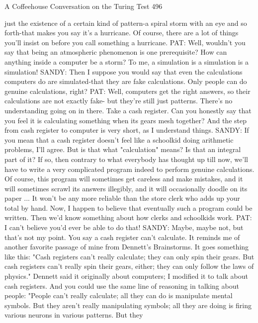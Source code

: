 A Coffeehouse Conversation on the Turing Test                                       496

   just the existence of a certain kind of pattern-a spiral storm with an eye and so
   forth-that makes you say it's a hurricane. Of course, there are a lot of things you'll
   insist on before you call something a hurricane.
PAT: Well, wouldn't you say that being an atmospheric phenomenon is one
   prerequisite? How can anything inside a computer be a storm? To me, a
   simulation is a simulation is a simulation!
SANDY: Then I suppose you would say that even the calculations computers do are
   simulated-that they are fake calculations. Only people can do genuine
   calculations, right?
PAT: Well, computers get the right answers, so their calculations are not exactly fake-
   but they're still just patterns. There's no understanding going on in there. Take a
   cash register. Can you honestly say that you feel it is calculating something when
   its gears mesh together? And the step from cash register to computer is very
   short, as I understand things.
SANDY: If you mean that a cash register doesn't feel like a schoolkid doing
   arithmetic problems, I'll agree. But is that what "calculation" means? Is that an
   integral part of it? If so, then contrary to what everybody has thought up till now,
   we'll have to write a very complicated program indeed to perform genuine
   calculations. Of course, this program will sometimes get careless and make
   mistakes, and it will sometimes scrawl its answers illegibly, and it will
   occasionally doodle on its paper ... It won't be any more reliable than the store
   clerk who adds up your total by hand. Now, I happen to believe that eventually
   such a program could be written. Then we'd know something about how clerks
   and schoolkids work.
PAT: I can't believe you'd ever be able to do that!
SANDY: Maybe, maybe not, but that's not my point. You say a cash register can't
   calculate. It reminds me of another favorite passage of mine from Dennett's
   Brainstorms. It goes something like this: "Cash registers can't really calculate;
   they can only spin their gears. But cash registers can't really spin their gears,
   either; they can only follow the laws of physics." Dennett said it originally about
   computers; I modified it to talk about cash registers. And you could use the same
   line of reasoning in talking about people: "People can't really calculate; all they
   can do is manipulate mental symbols. But they aren't really manipulating
   symbols; all they are doing is firing various neurons in various patterns. But they
